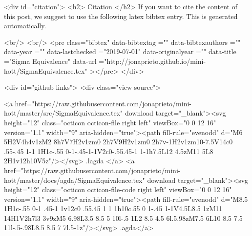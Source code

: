   
  <div id="citation">
  <h2> Citation </h2>
  If you want to cite the content of this post,
  we suggest to use the following latex bibtex entry.
  This is generated automatically.

  <br/>
  <br/>
  <pre class="bibtex"
       data-bibtextag =""
       data-bibtexauthors =""
       data-year =""
       data-lastchecked ="2019-07-01"
       data-originalyear =""
       data-title ="Sigma Equivalence"
       data-url ="http://jonaprieto.github.io/mini-hott/SigmaEquivalence.tex"
  ></pre>
  </div>
  

  <div id="github-links">
    <div class="view-source">
      
        <a href="https://raw.githubusercontent.com/jonaprieto/mini-hott/master/src/SigmaEquivalence.tex" download target="_blank"><svg height="12" class="octicon octicon-file right left" viewBox="0 0 12 16" version="1.1" width="9" aria-hidden="true"><path fill-rule="evenodd" d="M6 5H2V4h4v1zM2 8h7V7H2v1zm0 2h7V9H2v1zm0 2h7v-1H2v1zm10-7.5V14c0 .55-.45 1-1 1H1c-.55 0-1-.45-1-1V2c0-.55.45-1 1-1h7.5L12 4.5zM11 5L8 2H1v12h10V5z"/></svg> .lagda </a>
        <a href="https://raw.githubusercontent.com/jonaprieto/mini-hott/master/docs/agda/SigmaEquivalence.tex" download target="_blank"><svg height="12" class="octicon octicon-file-code right left" viewBox="0 0 12 16" version="1.1" width="9" aria-hidden="true"><path fill-rule="evenodd" d="M8.5 1H1c-.55 0-1 .45-1 1v12c0 .55.45 1 1 1h10c.55 0 1-.45 1-1V4.5L8.5 1zM11 14H1V2h7l3 3v9zM5 6.98L3.5 8.5 5 10l-.5 1L2 8.5 4.5 6l.5.98zM7.5 6L10 8.5 7.5 11l-.5-.98L8.5 8.5 7 7l.5-1z"/></svg> .agda</a>
      
